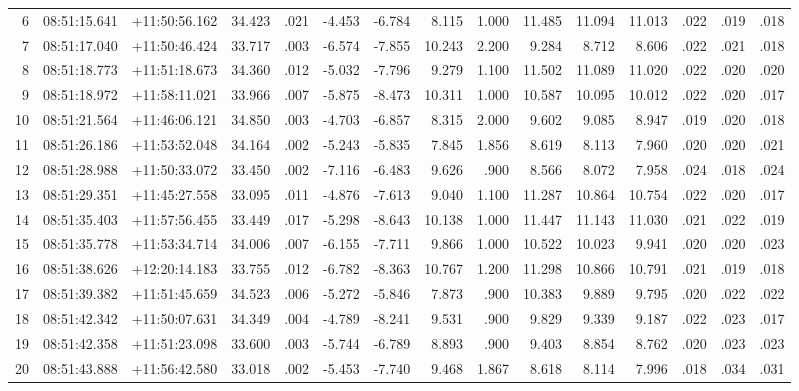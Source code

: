 \documentclass[a4paper,fleqn,usenatbib]{mnras}
\begin{document}
\begin{landscape}
\begin{table}
\begin{tabular}{|r|r|r|r|r|r|r|r|r|r|r|r|r|r|r|}
  6 & 08:51:15.641 & +11:50:56.162 & 34.423 & .021 & -4.453 & -6.784 & 8.115 & 1.000 & 11.485 & 11.094 & 11.013 & .022 & .019 & .018\\
  7 & 08:51:17.040 & +11:50:46.424 & 33.717 & .003 & -6.574 & -7.855 & 10.243 & 2.200 & 9.284 & 8.712 & 8.606 & .022 & .021 & .018\\
  8 & 08:51:18.773 & +11:51:18.673 & 34.360 & .012 & -5.032 & -7.796 & 9.279 & 1.100 & 11.502 & 11.089 & 11.020 & .022 & .020 & .020\\
  9 & 08:51:18.972 & +11:58:11.021 & 33.966 & .007 & -5.875 & -8.473 & 10.311 & 1.000 & 10.587 & 10.095 & 10.012 & .022 & .020 & .017\\
  10 & 08:51:21.564 & +11:46:06.121 & 34.850 & .003 & -4.703 & -6.857 & 8.315 & 2.000 & 9.602 & 9.085 & 8.947 & .019 & .020 & .018\\
  11 & 08:51:26.186 & +11:53:52.048 & 34.164 & .002 & -5.243 & -5.835 & 7.845 & 1.856 & 8.619 & 8.113 & 7.960 & .020 & .020 & .021\\
  12 & 08:51:28.988 & +11:50:33.072 & 33.450 & .002 & -7.116 & -6.483 & 9.626 & .900 & 8.566 & 8.072 & 7.958 & .024 & .018 & .024\\
  13 & 08:51:29.351 & +11:45:27.558 & 33.095 & .011 & -4.876 & -7.613 & 9.040 & 1.100 & 11.287 & 10.864 & 10.754 & .022 & .020 & .017\\
  14 & 08:51:35.403 & +11:57:56.455 & 33.449 & .017 & -5.298 & -8.643 & 10.138 & 1.000 & 11.447 & 11.143 & 11.030 & .021 & .022 & .019\\
  15 & 08:51:35.778 & +11:53:34.714 & 34.006 & .007 & -6.155 & -7.711 & 9.866 & 1.000 & 10.522 & 10.023 & 9.941 & .020 & .020 & .023\\
  16 & 08:51:38.626 & +12:20:14.183 & 33.755 & .012 & -6.782 & -8.363 & 10.767 & 1.200 & 11.298 & 10.866 & 10.791 & .021 & .019 & .018\\
  17 & 08:51:39.382 & +11:51:45.659 & 34.523 & .006 & -5.272 & -5.846 & 7.873 & .900 & 10.383 & 9.889 & 9.795 & .020 & .022 & .022\\
  18 & 08:51:42.342 & +11:50:07.631 & 34.349 & .004 & -4.789 & -8.241 & 9.531 & .900 & 9.829 & 9.339 & 9.187 & .022 & .023 & .017\\
  19 & 08:51:42.358 & +11:51:23.098 & 33.600 & .003 & -5.744 & -6.789 & 8.893 & .900 & 9.403 & 8.854 & 8.762 & .020 & .023 & .023\\
  20 & 08:51:43.888 & +11:56:42.580 & 33.018 & .002 & -5.453 & -7.740 & 9.468 & 1.867 & 8.618 & 8.114 & 7.996 & .018 & .034 & .031\\

\end{tabular}
\end{table}
\end{landscape}
\end{document}
